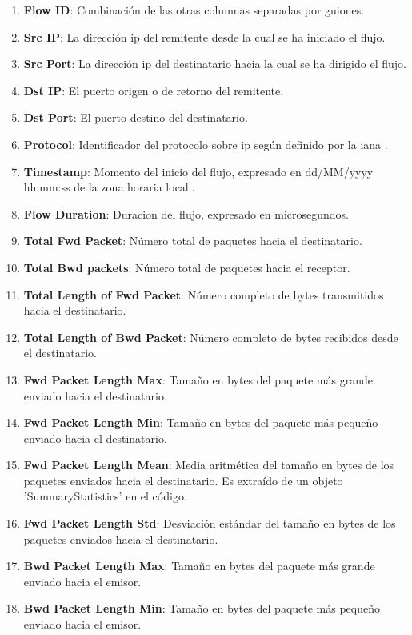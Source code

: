 \begin{enumerate}
    \itemsep0em 
    \item \textbf{Flow ID}: Combinación de las otras columnas separadas por guiones.
    \item \textbf{Src IP}: La dirección \acrshort{ip} del remitente desde la cual se ha iniciado el flujo.
    \item \textbf{Src Port}: La dirección \acrshort{ip} del destinatario hacia la cual se ha dirigido el flujo.
    \item \textbf{Dst IP}: El puerto origen o de retorno del remitente.
    \item \textbf{Dst Port}: El puerto destino del destinatario.
    \item \textbf{Protocol}: Identificador del protocolo sobre \acrshort{ip} según definido por la \acrshort{iana} \cite{ipprotocolnumbers}.
    \item \textbf{Timestamp}: Momento del inicio del flujo, expresado en dd/MM/yyyy hh:mm:ss de la zona horaria local..
    \item \textbf{Flow Duration}: Duracion del flujo, expresado en microsegundos.
    \item \textbf{Total Fwd Packet}: Número total de paquetes hacia el destinatario.
    \item \textbf{Total Bwd packets}: Número total de paquetes hacia el receptor.
    \item \textbf{Total Length of Fwd Packet}: Número completo de bytes transmitidos hacia el destinatario.
    \item \textbf{Total Length of Bwd Packet}: Número completo de bytes recibidos desde el destinatario.
    \item \textbf{Fwd Packet Length Max}: Tamaño en bytes del paquete más grande enviado hacia el destinatario.
    \item \textbf{Fwd Packet Length Min}: Tamaño en bytes del paquete más pequeño enviado hacia el destinatario.
    \item \textbf{Fwd Packet Length Mean}: Media aritmética del tamaño en bytes de los paquetes enviados hacia el destinatario. Es extraído de un objeto 'SummaryStatistics' en el código.
    \item \textbf{Fwd Packet Length Std}: Desviación estándar del tamaño en bytes de los paquetes enviados hacia el destinatario.
    \item \textbf{Bwd Packet Length Max}: Tamaño en bytes del paquete más grande enviado hacia el emisor.
    \item \textbf{Bwd Packet Length Min}: Tamaño en bytes del paquete más pequeño enviado hacia el emisor.

\end{enumerate}
